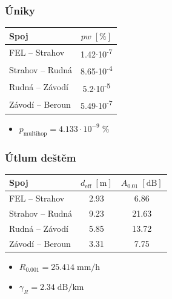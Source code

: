 \documentclass[aspectratio=169, 12pt, hyperref={unicode}]{beamer}
\begin{document}
\begin{frame}
\frametitle{Úniky}
\begin{table}[ht]
		\centering	
		\begin{tabular}[t]{|l||c|}
			\hline
			Spoj & $pw \; [\text{\%}]$\\
			\hline\hline
			FEL -- Strahov & 1.42$\cdot$10\textsuperscript{-7}\\  
			\hline
			Strahov -- Rudná & 8.65$\cdot$10\textsuperscript{-4}\\
			\hline
			Rudná -- Závodí & 5.2$\cdot$10\textsuperscript{-5} \\
			\hline
			Závodí -- Beroun & 5.49$\cdot$10\textsuperscript{-7} \\
			\hline
		\end{tabular}
	\end{table}
	\begin{itemize}
		\item $p_{\text{multihop}} = 4.133 \cdot 10^{-9} \; \text{\%}$
	\end{itemize}
\end{frame}

\begin{frame}
\frametitle{Útlum deštěm}
	\begin{table}[h!]
		\centering
		\begin{tabular}{| l || c | c |}
			\hline
			Spoj & $d_{\text{eff}} \; [\text{m}]$ & $A_{0.01} \; [\text{dB}]$\\
			\hline\hline
			FEL -- Strahov & 2.93 & 6.86\\
			\hline			
			Strahov -- Rudná & 9.23 & 21.63\\
			\hline
			Rudná -- Závodí & 5.85 & 13.72\\
			\hline
			Závodí -- Beroun & 3.31 & 7.75\\
			\hline
		\end{tabular}
	\end{table}
	\begin{itemize}
	\item $R_{0.001} = 25.414 \;\text{mm/h}$
	\item $\gamma_R = 2.34 \;\text{dB/km}$
	\end{itemize}
\end{frame}

\end{document}
